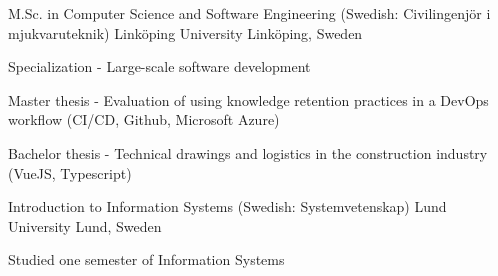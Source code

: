 
\begin{cventries}

\cventry
    {M.Sc. in Computer Science and Software Engineering (Swedish: Civilingenjör i mjukvaruteknik)} %
    {Linköping University} %
    {Linköping, Sweden} %
    {} %
    {
      \begin{cvitems} %
        \item {Specialization - Large-scale software development}
        \item {Master thesis - Evaluation of using knowledge retention practices in a DevOps workflow (CI/CD, Github, Microsoft Azure)}
        \item {Bachelor thesis - Technical drawings and logistics in the construction industry (VueJS, Typescript)}
      \end{cvitems}
    }

\cventry
    {Introduction to Information Systems (Swedish: Systemvetenskap)} %
    {Lund University} %
    {Lund, Sweden} %
    {} %
    {
      \begin{cvitems} %
        \item {Studied one semester of Information Systems}
      \end{cvitems}
    }
\end{cventries}
